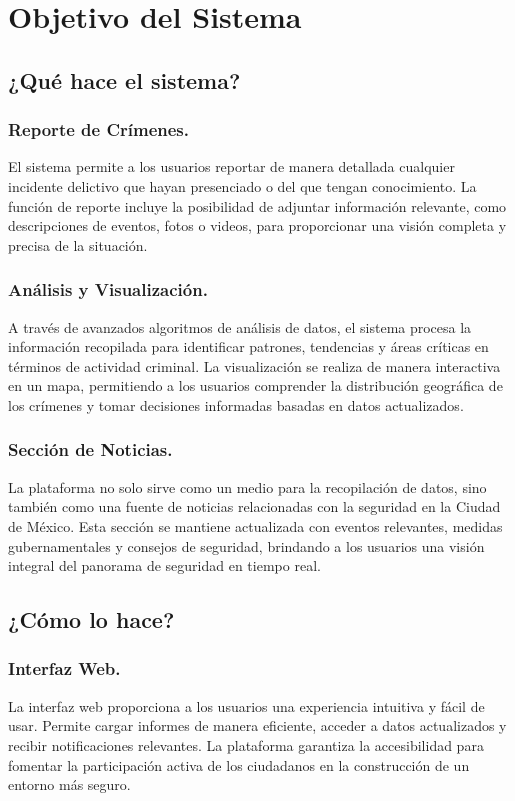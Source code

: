 \documentclass{article}
\begin{document}
\section{Objetivo del Sistema}
    \subsection{¿Qué hace el sistema?}

        \subsubsection{Reporte de Crímenes.}
        El sistema permite a los usuarios reportar de manera detallada cualquier incidente delictivo que hayan presenciado o del que tengan conocimiento. La función de reporte incluye la posibilidad de adjuntar información relevante, como descripciones de eventos, fotos o videos, para proporcionar una visión completa y precisa de la situación.

        \subsubsection{Análisis y Visualización.}
        A través de avanzados algoritmos de análisis de datos, el sistema procesa la información recopilada para identificar patrones, tendencias y áreas críticas en términos de actividad criminal. La visualización se realiza de manera interactiva en un mapa, permitiendo a los usuarios comprender la distribución geográfica de los crímenes y tomar decisiones informadas basadas en datos actualizados.

        \subsubsection{Sección de Noticias.}
        La plataforma no solo sirve como un medio para la recopilación de datos, sino también como una fuente de noticias relacionadas con la seguridad en la Ciudad de México. Esta sección se mantiene actualizada con eventos relevantes, medidas gubernamentales y consejos de seguridad, brindando a los usuarios una visión integral del panorama de seguridad en tiempo real.

    \subsection{¿Cómo lo hace?}

        \subsubsection{Interfaz Web.}
        La interfaz web proporciona a los usuarios una experiencia intuitiva y fácil de usar. Permite cargar informes de manera eficiente, acceder a datos actualizados y recibir notificaciones relevantes. La plataforma garantiza la accesibilidad para fomentar la participación activa de los ciudadanos en la construcción de un entorno más seguro.
\end{document}
